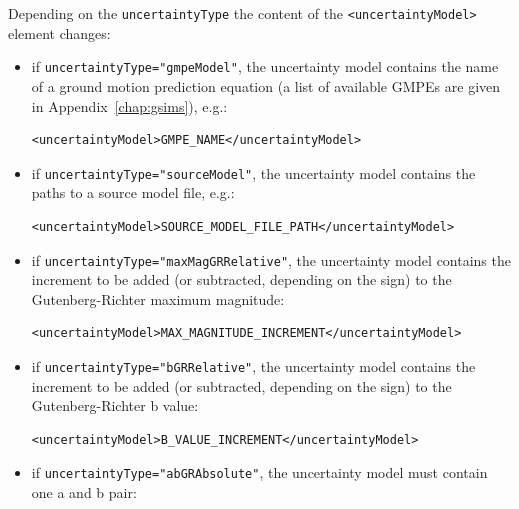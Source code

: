 Depending on the \Verb+uncertaintyType+ the content of the
\Verb+<uncertaintyModel>+ element changes:

\begin{itemize}

    \item if \Verb+uncertaintyType="gmpeModel"+, the uncertainty model
	contains the name of a ground motion prediction equation (a list of
	available GMPEs are given in Appendix~\ref{chap:gsims}), e.g.:

	\begin{Verbatim}[frame=single, commandchars=\\\{\}]
	<uncertaintyModel>GMPE_NAME</uncertaintyModel>
	\end{Verbatim}

    \item if \Verb+uncertaintyType="sourceModel"+, the uncertainty model
	contains the paths to a source model file, e.g.:

	\begin{Verbatim}[frame=single, commandchars=\\\{\}]
	<uncertaintyModel>SOURCE_MODEL_FILE_PATH</uncertaintyModel>
	\end{Verbatim}

    \item if \Verb+uncertaintyType="maxMagGRRelative"+, the uncertainty model
	contains the increment to be added (or subtracted, depending on the sign)
	to the Gutenberg-Richter maximum magnitude:

	\begin{Verbatim}[frame=single, commandchars=\\\{\}, samepage=true]
	<uncertaintyModel>MAX_MAGNITUDE_INCREMENT</uncertaintyModel>
	\end{Verbatim}

    \item if \Verb+uncertaintyType="bGRRelative"+, the uncertainty model
	contains the increment to be added (or subtracted, depending on the sign)
	to the Gutenberg-Richter b value:

	\begin{Verbatim}[frame=single, commandchars=\\\{\}, samepage=true]
	<uncertaintyModel>B_VALUE_INCREMENT</uncertaintyModel>
	\end{Verbatim}

    \item if \Verb+uncertaintyType="abGRAbsolute"+, the uncertainty model
	must contain one a and b pair:


\end{itemize}
